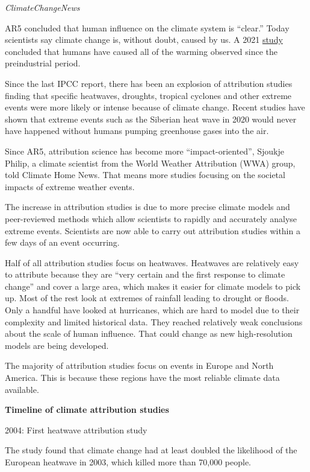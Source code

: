 \documentclass[
]{book}
\begin{document}
\emph{ClimateChangeNews}

AR5 concluded that human influence on the climate system is ``clear.'' Today scientists say climate change is, without doubt, caused by us. A 2021 \href{https://www.nature.com/articles/s41558-020-00965-9}{study} concluded that humans have caused all of the warming observed since the preindustrial period.

Since the last IPCC report, there has been an explosion of attribution studies finding that specific heatwaves, droughts, tropical cyclones and other extreme events were more likely or intense because of climate change. Recent studies have shown that extreme events such as the Siberian heat wave in 2020 would never have happened without humans pumping greenhouse gases into the air.

Since AR5, attribution science has become more ``impact-oriented'', Sjoukje Philip, a climate scientist from the World Weather Attribution (WWA) group, told Climate Home News.
That means more studies focusing on the societal impacts of extreme weather events.

The increase in attribution studies is due to more precise climate models and peer-reviewed methods which allow scientists to rapidly and accurately analyse extreme events.
Scientists are now able to carry out attribution studies within a few days of an event occurring.

Half of all attribution studies focus on heatwaves.
Heatwaves are relatively easy to attribute because they are ``very certain and the first response to climate change'' and cover a large area, which makes it easier for climate models to pick up.
Most of the rest look at extremes of rainfall leading to drought or floods.
Only a handful have looked at hurricanes, which are hard to model due to their complexity and limited historical data. They reached relatively weak conclusions about the scale of human influence.
That could change as new high-resolution models are being developed.

The majority of attribution studies focus on events in Europe and North America. This is because these regions have the most reliable climate data available.

\textbf{Timeline of climate attribution studies}

2004: First heatwave attribution study

The study found that climate change had at least doubled the likelihood of the European heatwave in 2003, which killed more than 70,000 people.
\end{document}
